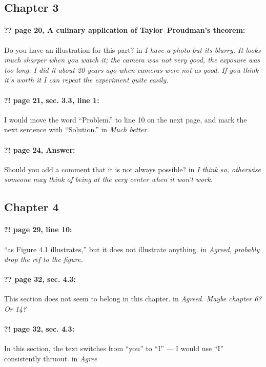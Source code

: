 \documentclass[twoside]{article}
\begin{document}
\subsection*{Chapter 3}

\paragraph{?? page 20, A culinary application of Taylor--Proudman’s theorem:} Do you have an illustration for this part? 
 in {\it   I have a photo but its blurry. It looks much sharper when you watch it; the camera was not very good, the exposure was too long. I did it about 20 years ago when cameras were not as good. If you think it's worth it I can repeat the experiment quite easily.  } 

\paragraph{?! page 21, sec. 3.3, line 1:} I would move the word “Problem.” to line 10 on the next page, and mark the next sentence with “Solution.”
 in {\it Much better. } 

\paragraph{?! page 24, Answer:} Should you add a comment that it is not always possible?
 in {\it  I think so, otherwise someone may think of being at the very center when it won't work. } 

\subsection*{Chapter 4}

\paragraph{?! page 29, line 10:} “as Figure 4.1 illustrates,” but it does not illustrate anything.
 in {\it  Agreed, probably drop the ref to the figure.} 

\paragraph{?? page 32, sec. 4.3:} This section does not seem to belong in this chapter.
 in {\it  Agreed. Maybe chapter 6? Or 14?} 

\paragraph{?! page 32, sec. 4.3:} In this section, the text switches from “you” to “I” — I would use “I” consistently thruout.
 in {\it Agree } 
\end{document}
